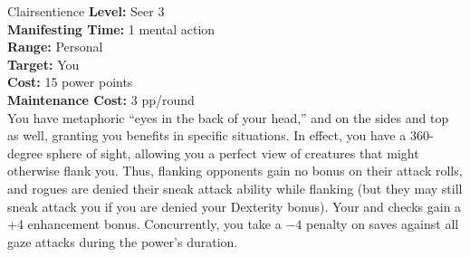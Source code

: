{Clairsentience}
{
	\textbf{Level:}
	Seer 3\\
	\textbf{Manifesting Time:}
	1 mental action\\
	\textbf{Range:}
	Personal\\
	\textbf{Target:}
	You\\
	\textbf{Cost:}
	15 power points\\
	\textbf{Maintenance Cost:}
	3 pp/round\\
}
{
	You have metaphoric ``eyes in the back of your head,'' and on the sides and top as well, granting you benefits in specific situations. In effect, you have a 360-degree sphere of sight, allowing you a perfect view of creatures that might otherwise flank you. Thus, flanking opponents gain no bonus on their attack rolls, and rogues are denied their sneak attack ability while flanking (but they may still sneak attack you if you are denied your Dexterity bonus). Your  and  checks gain a +4 enhancement bonus. Concurrently, you take a $-4$ penalty on saves against all gaze attacks during the power's duration. 
}